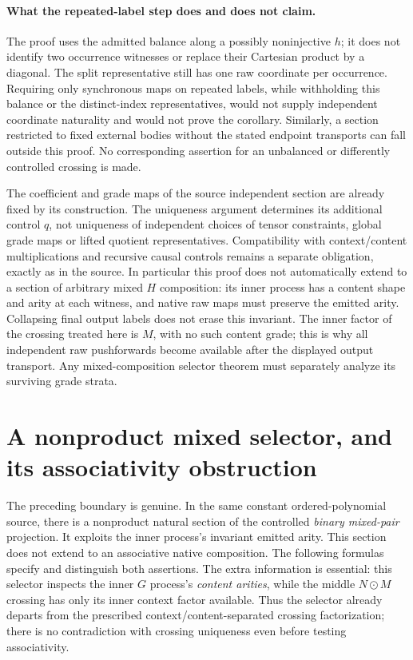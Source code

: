 \documentclass{article}
\begin{document}
\paragraph{What the repeated-label step does and does not claim.}
The proof uses the admitted balance along a possibly noninjective $h$;
it does not identify two occurrence witnesses or replace their Cartesian
product by a diagonal. The split representative still has one raw coordinate
per occurrence. Requiring only synchronous maps on repeated labels, while
withholding this balance or the distinct-index representatives, would not
supply independent coordinate naturality and would not prove the corollary.
Similarly, a section restricted to fixed external bodies without the stated
endpoint transports can fall outside this proof. No corresponding assertion
for an unbalanced or differently controlled crossing is made.

The coefficient and grade maps of the source independent section are already
fixed by its construction. The uniqueness argument determines its additional
control $q$, not uniqueness of independent choices of tensor constraints,
global grade maps or lifted quotient representatives. Compatibility with
context/content multiplications and recursive causal controls remains a
separate obligation, exactly as in the source. In particular this proof does
not automatically extend to a section of arbitrary mixed $H$ composition:
its inner process has a content shape and arity at each witness, and native
raw maps must preserve the emitted arity. Collapsing final output labels does
not erase this invariant. The inner factor of the crossing treated here is
$M$, with no such content grade; this is why all independent raw pushforwards
become available after the displayed output transport. Any mixed-composition
selector theorem must separately analyze its surviving grade strata.

\section{A nonproduct mixed selector, and its associativity obstruction}
The preceding boundary is genuine. In the same constant ordered-polynomial
source, there is a nonproduct natural section of the controlled \emph{binary
mixed-pair} projection. It exploits the inner process's invariant emitted
arity. This section does not extend to an associative native composition.
The following formulas specify and distinguish both assertions. The extra
information is essential: this selector inspects the inner $G$ process's
\emph{content arities}, while the middle $N\odot M$ crossing has only its
inner context factor available. Thus the selector already departs from the
prescribed context/content-separated crossing factorization; there is no
contradiction with crossing uniqueness even before testing associativity.
\end{document}

